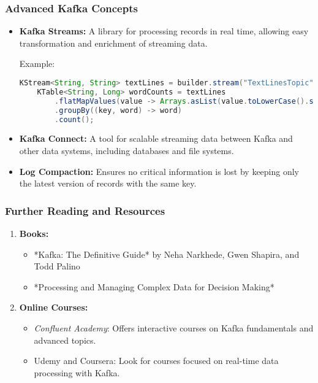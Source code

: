 \documentclass[aspectratio=169]{beamer}
\begin{document}
\begin{frame}[fragile]
  \frametitle{Advanced Kafka Concepts}
  \begin{itemize}
    \item \textbf{Kafka Streams:} A library for processing records in real time, allowing easy transformation and enrichment of streaming data.
    
    \begin{block}{Example:}
    \begin{lstlisting}[language=Java]
    KStream<String, String> textLines = builder.stream("TextLinesTopic");
    KTable<String, Long> wordCounts = textLines
        .flatMapValues(value -> Arrays.asList(value.toLowerCase().split("\\W+")))
        .groupBy((key, word) -> word)
        .count();
    \end{lstlisting}
    \end{block}
    
    \item \textbf{Kafka Connect:} A tool for scalable streaming data between Kafka and other data systems, including databases and file systems.
    
    \item \textbf{Log Compaction:} Ensures no critical information is lost by keeping only the latest version of records with the same key.
  \end{itemize}
\end{frame}

\begin{frame}[fragile]
  \frametitle{Further Reading and Resources}
  \begin{enumerate}
    \item \textbf{Books:}
      \begin{itemize}
        \item *Kafka: The Definitive Guide* by Neha Narkhede, Gwen Shapira, and Todd Palino
        \item *Processing and Managing Complex Data for Decision Making*
      \end{itemize}
      
    \item \textbf{Online Courses:}
      \begin{itemize}
        \item \textit{Confluent Academy}: Offers interactive courses on Kafka fundamentals and advanced topics.
        \item Udemy and Coursera: Look for courses focused on real-time data processing with Kafka.
      \end{itemize}
  \end{enumerate}
\end{frame}
\end{document}
